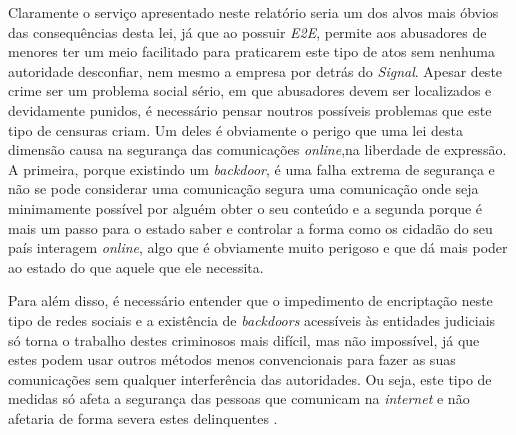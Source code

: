 Claramente o serviço apresentado neste relatório seria um dos alvos mais óbvios das consequências desta lei, já que ao possuir \textit{E2E}, permite aos abusadores de menores ter um meio facilitado para praticarem este tipo de atos sem nenhuma autoridade desconfiar, nem mesmo a empresa por detrás do \textit{Signal}. Apesar deste crime ser um problema social sério, em que abusadores devem ser localizados e devidamente punidos, é necessário pensar noutros possíveis problemas que este tipo de censuras criam. Um deles é obviamente o perigo que uma lei desta dimensão causa na segurança das comunicações \textit{online},na liberdade de expressão. A primeira, porque existindo um \textit{backdoor}, é uma falha extrema de segurança e não se pode considerar uma comunicação segura uma comunicação onde seja minimamente possível por alguém obter o seu conteúdo e a segunda porque é mais um passo para o estado saber e controlar a forma como os cidadão do seu país interagem \textit{online}, algo que é obviamente muito perigoso e que dá mais poder ao estado do que aquele que ele necessita.

Para além disso, é necessário entender que o impedimento de encriptação neste tipo de redes sociais e a existência de \textit{backdoors} acessíveis às entidades judiciais só torna o trabalho destes criminosos mais difícil, mas não impossível, já que estes podem usar outros métodos menos convencionais para fazer as suas comunicações sem qualquer interferência das autoridades. Ou seja, este tipo de medidas só afeta a segurança das pessoas que comunicam na \textit{internet} e não afetaria de forma severa estes delinquentes \cite{sigan_blog_earn_it}.


